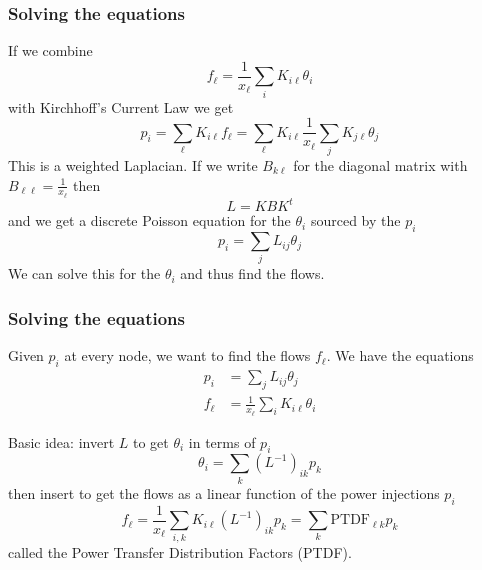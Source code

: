 \documentclass[10pt,dvipsnames]{beamer}
\begin{document}
\begin{frame}
  \frametitle{Solving the equations}

  If we combine
    \begin{equation*}
    f_\ell  = \frac{1}{x_\ell}\sum_{i} K_{i\ell} \theta_i
  \end{equation*}
    with Kirchhoff's Current Law we get
    \begin{equation*}
    p_i = \sum_{\ell} K_{i\ell}f_\ell =   \sum_{\ell} K_{i\ell} \frac{1}{x_\ell}\sum_{j} K_{j\ell} \theta_j
    \end{equation*}
    This is a \alert{weighted Laplacian}. If we write $B_{k\ell}$ for the diagonal matrix with $B_{\ell\ell} = \frac{1}{x_\ell}$ then
    \begin{equation*}
      L = KBK^t
    \end{equation*}
    and we get a \alert{discrete Poisson equation} for the $\theta_i$ sourced by the $p_i$
    \begin{equation*}
      p_i = \sum_{j} L_{ij} \theta_j
    \end{equation*}
    We can solve this for the $\theta_i$ and thus find the flows.

\end{frame}


\begin{frame}
  \frametitle{Solving the equations}

  Given $p_i$ at every node, we want to find the flows $f_\ell$. We
  have the equations
    \begin{align*}
      p_i & = \sum_{j} L_{ij} \theta_j \\
     f_\ell  & = \frac{1}{x_\ell}\sum_{i} K_{i\ell} \theta_i
    \end{align*}

    Basic idea: invert $L$ to get $\theta_i$ in terms of $p_i$
    \begin{equation*}
      \theta_i  = \sum_{k} (L^{-1})_{ik} p_k
    \end{equation*}
    then insert to get the flows as a linear function of the power injections $p_i$
    \begin{equation*}
    f_\ell   = \frac{1}{x_\ell}\sum_{i,k} K_{i\ell}  (L^{-1})_{ik} p_k = \sum_k \textrm{PTDF}_{\ell k} p_k
    \end{equation*}
    called the \alert{Power Transfer Distribution Factors} (PTDF).

\end{frame}
\end{document}
